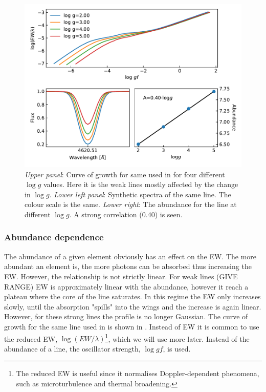 \begin{figure}[htpb!]
    \centering
    \includegraphics[width=1.0\linewidth]{figures/ewGravity.pdf}
    \caption{\emph{Upper panel}: Curve of growth for same  used in
              for four different $\log g$ values. Here it is
             the weak lines mostly affected by the change in $\log g$.
             \emph{Lower left panel}: Synthetic spectra of the same line. The
             colour scale is the same.
             \emph{Lower right}: The abundance for the line at different
             $\log g$. A strong correlation (0.40) is seen.}
    \label{fig:ewGravity}
\end{figure}




\subsubsection{Abundance dependence}

The abundance of a given element obviously has an effect on the EW. The more
abundant an element is, the more photons can be absorbed thus increasing the EW.
However, the relationship is not strictly linear. For weak lines (GIVE RANGE) EW
is approximately linear with the abundance, however it reach a plateau where the
core of the line saturates. In this regime the EW only increases slowly, until
the absorption "spills" into the wings and the increase is again linear.
However, for these strong lines the profile is no longer Gaussian. The curve of
growth for the same  line used in  is shown in
. Instead of EW it is common to use the reduced EW, $\log
(EW/\lambda)$\footnote{The reduced EW is useful since it normalises
Doppler-dependent phenomena, such as microturbulence and thermal broadening.},
which we will use more later. Instead of the abundance of a line, the oscillator
strength, $\log \mathit{gf}$, is used.

